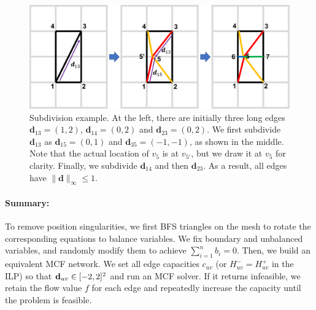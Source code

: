 \begin{figure}
\centering
\includegraphics[width=0.6\linewidth]{quadriflow/diagram/subdivide.pdf}
\caption{Subdivision example. At the left, there are initially three long edges ${\textbf{d}}_{13}=(1,2)$, ${\textbf{d}}_{14}=(0,2)$ and ${\textbf{d}}_{23}=(0,2)$. We first subdivide ${\textbf{d}}_{13}$ as ${\textbf{d}}_{15}=(0,1)$ and ${\textbf{d}}_{35}=(-1,-1)$, as shown in the middle. Note that the actual location of $v_5$ is at $v_{5'}$, but we draw it at $v_5$ for clarity. Finally, we subdivide ${\textbf{d}}_{14}$ and then ${\textbf{d}}_{23}$. As a result, all edges have $\|{\textbf{d}}\|_{\infty}\leq 1$.}
\label{fig:quad-subdivide}
\end{figure}

\paragraph*{Summary:}
To remove position singularities, we first BFS triangles on the mesh to rotate the corresponding equations to balance variables. We fix boundary and unbalanced variables, and randomly modify them to achieve $\sum_{i=1}^n b_i=0$. Then, we build an equivalent MCF network. We set all edge capacities $c_{uv}$ (or $H^-_{uv}=H^+_{uv}$ in the ILP) so that $\mathbf{d}_{uv} \in [-2,2]^2$ and run an MCF solver. If it returns infeasible, we retain the flow value $f$ for each edge and repeatedly increase the capacity until the problem is feasible.

%

